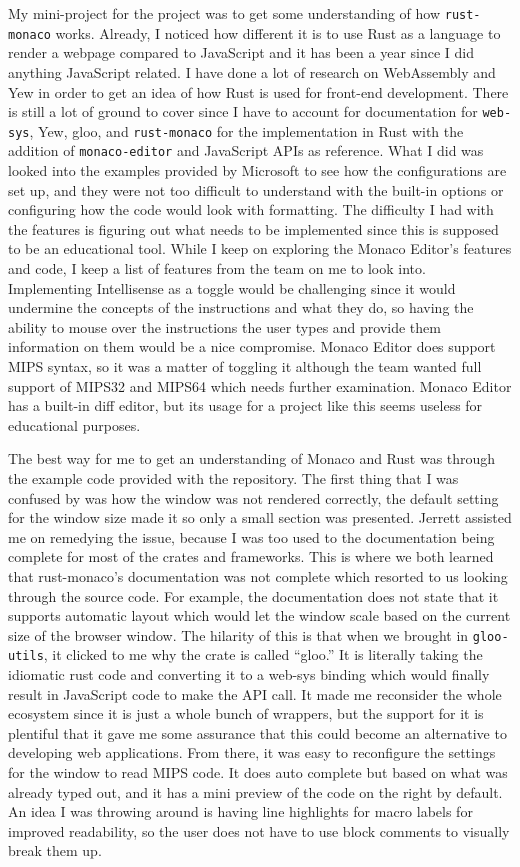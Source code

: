 \documentclass[
    paper=letter,
    parskip=half,
    fontsize=12pt,
    titlepage=firstiscover,
    toc=bibliography,
    numbers=endperiod
]{scrartcl}
\begin{document}
My mini-project for the project was to get some understanding of how
\texttt{rust-monaco} works. Already, I noticed how different it is to
use Rust as a language to render a webpage compared to JavaScript and it
has been a year since I did anything JavaScript related. I have done a
lot of research on WebAssembly and Yew in order to get an idea of how
Rust is used for front-end development. There is still a lot of ground
to cover since I have to account for documentation for \texttt{web-sys},
Yew, gloo, and \texttt{rust-monaco} for the implementation in Rust with
the addition of \texttt{monaco-editor} and JavaScript APIs as reference.
What I did was looked into the examples provided by Microsoft to see how
the configurations are set up, and they were not too difficult to
understand with the built-in options or configuring how the code would
look with formatting. The difficulty I had with the features is figuring
out what needs to be implemented since this is supposed to be an
educational tool. While I keep on exploring the Monaco Editor's features
and code, I keep a list of features from the team on me to look into.
Implementing Intellisense as a toggle would be challenging since it
would undermine the concepts of the instructions and what they do, so
having the ability to mouse over the instructions the user types and
provide them information on them would be a nice compromise. Monaco
Editor does support MIPS syntax, so it was a matter of toggling it
although the team wanted full support of MIPS32 and MIPS64 which needs
further examination. Monaco Editor has a built-in diff editor, but its
usage for a project like this seems useless for educational purposes.

The best way for me to get an understanding of Monaco and Rust was
through the example code provided with the repository. The first thing
that I was confused by was how the window was not rendered correctly,
the default setting for the window size made it so only a small section
was presented. Jerrett assisted me on remedying the issue, because I was
too used to the documentation being complete for most of the crates and
frameworks. This is where we both learned that rust-monaco's
documentation was not complete which resorted to us looking through the
source code. For example, the documentation does not state that it
supports automatic layout which would let the window scale based on the
current size of the browser window. The hilarity of this is that when we
brought in \texttt{gloo-utils}, it clicked to me why the crate is called
``gloo.'' It is literally taking the idiomatic rust code and converting
it to a web-sys binding which would finally result in JavaScript code to
make the API call. It made me reconsider the whole ecosystem since it is
just a whole bunch of wrappers, but the support for it is plentiful that
it gave me some assurance that this could become an alternative to
developing web applications. From there, it was easy to reconfigure the
settings for the window to read MIPS code. It does auto complete but
based on what was already typed out, and it has a mini preview of the
code on the right by default. An idea I was throwing around is having
line highlights for macro labels for improved readability, so the user
does not have to use block comments to visually break them up.
\end{document}

